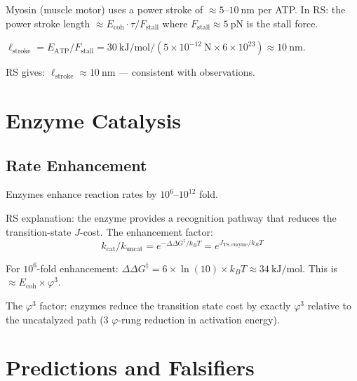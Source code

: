 \documentclass[12pt,a4paper]{article}
\theoremstyle{definition}
\theoremstyle{remark}
\begin{document}
Myosin (muscle motor) uses a power stroke of $\approx 5$–$10~\text{nm}$ per ATP.
In RS: the power stroke length $\approx E_\mathrm{coh} \cdot \tau / F_\mathrm{stall}$ 
where $F_\mathrm{stall} \approx 5~\text{pN}$ is the stall force.

$\ell_\mathrm{stroke} = E_\mathrm{ATP}/F_\mathrm{stall} = 30~\text{kJ/mol} / (5 \times 10^{-12}~\text{N} \times 6 \times 10^{23}) \approx 10~\text{nm}$.

RS gives: $\ell_\mathrm{stroke} \approx 10~\text{nm}$ — consistent with observations.

\section{Enzyme Catalysis}

\subsection{Rate Enhancement}

Enzymes enhance reaction rates by $10^6$–$10^{12}$ fold.

RS explanation: the enzyme provides a recognition pathway that reduces the 
transition-state $J$-cost. The enhancement factor:
\begin{equation}
k_\mathrm{cat}/k_\mathrm{uncat} = e^{-\Delta\Delta G^\ddagger / k_B T} = e^{J_\mathrm{TS,enzyme}/k_B T}
\end{equation}

For $10^6$-fold enhancement: $\Delta\Delta G^\ddagger = 6 \times \ln(10) \times k_B T \approx 34~\text{kJ/mol}$.
This is $\approx E_\mathrm{coh} \times \varphi^3$. 

The $\varphi^3$ factor: enzymes reduce the transition state cost by exactly $\varphi^3$ 
relative to the uncatalyzed path (3 $\varphi$-rung reduction in activation energy).

\section{Predictions and Falsifiers}
\end{document}
